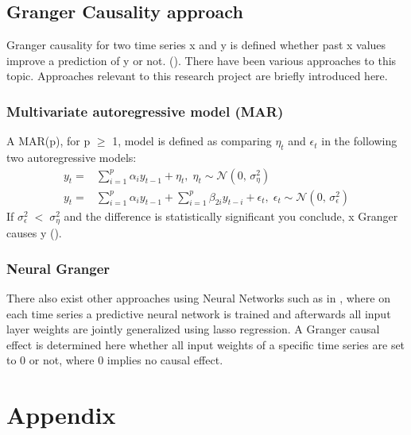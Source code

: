 \documentclass[a4paper]{report}
\begin{document}
	
	
	\section{Granger Causality approach}
	Granger causality for two time series x and y is defined whether past x values improve a prediction of y or not. (\cite{Granger.1969}). 
	There have been various approaches to this topic. Approaches relevant to this research project are briefly introduced here.
	
	\subsection{Multivariate autoregressive model (MAR)} 
	A MAR(p), for p $\geq$ 1, model is defined as comparing $\eta_t$ and $\epsilon_t$ in the following two autoregressive models:
	\begin{align}
		y_t =& \sum_{i=1}^{p} \alpha_i y_{t-1}+\eta_t, \; \eta_t \sim \mathcal{N}(0,\,\sigma_\eta^{2})\\
		y_t = &\sum_{i=1}^{p} \alpha_i y_{t-1}+ \sum_{i=1}^{p}\beta_{2i}y_{t-i}+\epsilon_t, \; \epsilon_t \sim \mathcal{N}(0,\,\sigma_\epsilon^{2})
	\end{align}
	If $\sigma_\epsilon^{2} \; < \; \sigma_\eta^{2} $ and the difference is statistically significant you conclude, x Granger causes y (\cite{Geweke.1982}).\\
	
	\subsection{Neural Granger}
	There also exist other approaches using Neural Networks such as in \cite{Tank.2020}, where on each time series a predictive neural network is trained and afterwards all input layer weights are jointly generalized using lasso regression. A Granger causal effect is determined here whether all input weights of a specific time series are set to 0 or not, where 0 implies no causal effect. 
	
	
	
	\chapter{Appendix}
	
	\printbibliography
\end{document}
